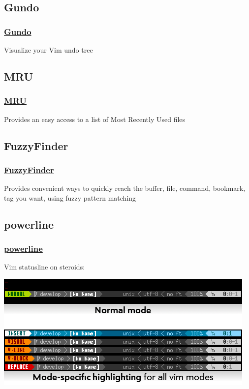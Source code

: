 \documentclass[14pt,svgnames,compress]{beamer}
\newcommand\hl[1]{\textcolor{HlColor}{#1}}
\begin{document}
\subsection{Gundo}

\begin{frame}
    \frametitle{
        \href{https://github.com/vim-scripts/Gundo}
             {Gundo}
    }
    \large
    Visualize your Vim undo tree
\end{frame}


\subsection{MRU}

\begin{frame}
    \frametitle{
        \href{https://github.com/vim-scripts/mru.vim}
             {MRU}
    }
    \large
    Provides an easy access to a list of \hl{M}ost \hl{R}ecently \hl{U}sed files \\
\end{frame}


\subsection{FuzzyFinder}

\begin{frame}
    \frametitle{
        \href{https://github.com/vim-scripts/FuzzyFinder}
             {FuzzyFinder}
    }
    \large
    Provides convenient ways to quickly reach the buffer, file, command,
    bookmark, tag you want, using fuzzy pattern matching \\
\end{frame}


\subsection{powerline}

\begin{frame}
    \frametitle{
        \href{https://github.com/Lokaltog/vim-powerline}
             {powerline}
    }
    \large
    \vspace{1em}
    Vim statusline on steroids: \\ \bigskip
    \begin{center}
        \includegraphics[scale=.4]{figures/vim_powerline_modes.png}
    \end{center}
\end{frame}
\end{document}
